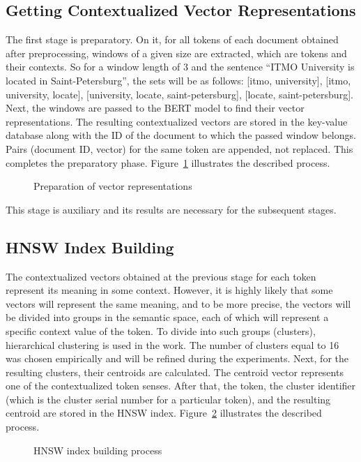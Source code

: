 \documentclass[
    twocolumn,
]{template/ceurart}
\begin{document}
    \subsection{Getting Contextualized Vector Representations}
    The first stage is preparatory.
    On it, for all tokens of each document obtained after preprocessing,
    windows of a given size are extracted, which are tokens and their contexts.
    So for a window length of 3 and the sentence ``ITMO University is located in Saint-Petersburg'',
    the sets will be as follows: [itmo, university], [itmo, university, locate],
    [university, locate, saint-petersburg], [locate, saint-petersburg].
    Next, the windows are passed to the BERT model to find their vector representations.
    The resulting contextualized vectors are stored in the key-value database
    along with the ID of the document to which the passed window belongs.
    Pairs (document ID, vector) for the same token are appended, not replaced.
    This completes the preparatory phase.
    Figure~\ref{fig:storeVectors} illustrates the described process.
    \begin{figure}
        \centering
        
        \caption{Preparation of vector representations}
        \label{fig:storeVectors}
    \end{figure}

    This stage is auxiliary and its results are necessary for the subsequent stages.

    \subsection{HNSW Index Building}
    The contextualized vectors obtained at the previous stage for each token represent its meaning in some context.
    However, it is highly likely that some vectors will represent the same meaning, and to be more precise,
    the vectors will be divided into groups in the semantic space,
    each of which will represent a specific context value of the token.
    To divide into such groups (clusters), hierarchical clustering is used in the work.
    The number of clusters equal to 16 was chosen empirically and will be refined during the experiments.
    Next, for the resulting clusters, their centroids are calculated.
    The centroid vector represents one of the contextualized token senses.
    After that, the token, the cluster identifier (which is the cluster serial number for a particular token),
    and the resulting centroid are stored in the HNSW index.
    Figure~\ref{fig:hnswIndexBuilding} illustrates the described process.
    \begin{figure}
        \centering
        
        \caption{HNSW index building process}
        \label{fig:hnswIndexBuilding}
    \end{figure}
\end{document}
